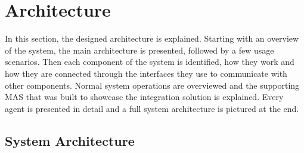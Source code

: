 











\glsresetall


\chapter{Architecture}
\label{cha:architecture}

In this section, the designed architecture is explained. Starting with an overview of the system, the main architecture is presented, followed by a few usage scenarios. Then each component of the system is identified, how they work and how they are connected through the interfaces they use to communicate with other components. Normal system operations are overviewed and the supporting \acrlong{MAS} that was built to showcase the integration solution is explained. Every agent is presented in detail and a full system architecture is pictured at the end.

\section{System Architecture}
\label{sec:developed_architecture}

